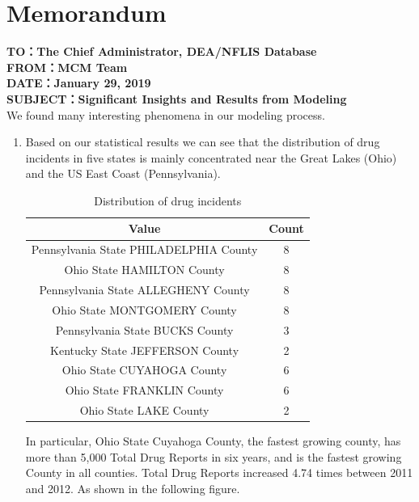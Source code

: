 \documentclass{mcmthesis}
\begin{document}
\section{Memorandum}
\textbf{
TO：The Chief Administrator, DEA/NFLIS Database\\
FROM：MCM Team\\
DATE：January 29, 2019\\
SUBJECT：Significant Insights and Results from Modeling}\\
We found many interesting phenomena in our modeling process.
\begin{enumerate}
  \item Based on our statistical results we can see that the distribution of drug incidents in five states is mainly concentrated near the Great Lakes (Ohio) and the US East Coast (Pennsylvania).
\begin{table}[htbp]
  \centering
  \caption{Distribution of drug incidents}
    \begin{tabular}{cc}
    \toprule
    Value & Count \\
    \midrule
    Pennsylvania State PHILADELPHIA County & 8 \\
    Ohio State HAMILTON County & 8 \\
    Pennsylvania State ALLEGHENY County & 8 \\
    Ohio State MONTGOMERY County & 8 \\
    Pennsylvania State BUCKS County & 3 \\
    Kentucky State JEFFERSON County & 2 \\
    Ohio State CUYAHOGA County & 6 \\
    Ohio State FRANKLIN County & 6 \\
    Ohio State LAKE County & 2 \\
    \bottomrule
    \end{tabular}%
  \label{tab:addlabel}%
\end{table}%

In particular, Ohio State Cuyahoga County, the fastest growing county, has more than 5,000 Total Drug Reports in six years, and is the fastest growing County in all counties. Total Drug Reports increased 4.74 times between 2011 and 2012. As shown in the following figure.
	

\end{enumerate}
\end{document}
